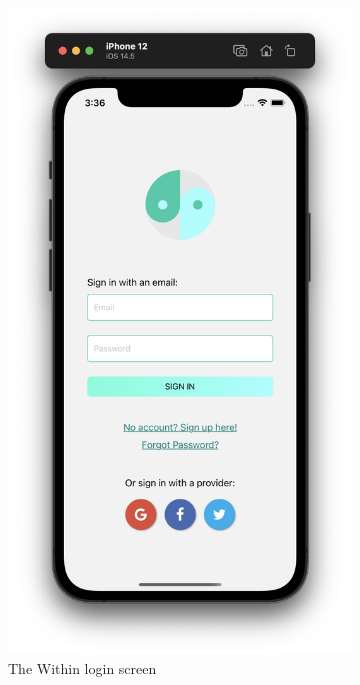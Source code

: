 \begin{figure}[h]
    \centering
    \begin{subfigure}{0.4\linewidth}
        \centering
        \includegraphics[scale=0.25]{images/login_screen.png}
        \caption{The Within login screen}
        \label{fig:login_screen}
    \end{subfigure}%
    \begin{subfigure}{0.4\linewidth}

\end{subfigure}
\end{figure}
